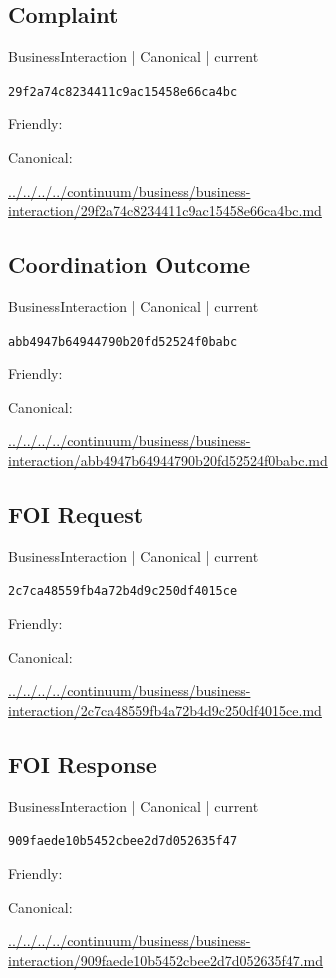 \documentclass[10pt,a4paper]{article}
\begin{document}
\subsection*{Complaint}
{\small BusinessInteraction | Canonical | current}\par
\texttt{29f2a74c8234411c9ac15458e66ca4bc}\par
Friendly: \par
Canonical: \par
{\footnotesize\url{../../../../continuum/business/business-interaction/29f2a74c8234411c9ac15458e66ca4bc.md}}\par
\subsection*{Coordination Outcome}
{\small BusinessInteraction | Canonical | current}\par
\texttt{abb4947b64944790b20fd52524f0babc}\par
Friendly: \par
Canonical: \par
{\footnotesize\url{../../../../continuum/business/business-interaction/abb4947b64944790b20fd52524f0babc.md}}\par
\subsection*{FOI Request}
{\small BusinessInteraction | Canonical | current}\par
\texttt{2c7ca48559fb4a72b4d9c250df4015ce}\par
Friendly: \par
Canonical: \par
{\footnotesize\url{../../../../continuum/business/business-interaction/2c7ca48559fb4a72b4d9c250df4015ce.md}}\par
\subsection*{FOI Response}
{\small BusinessInteraction | Canonical | current}\par
\texttt{909faede10b5452cbee2d7d052635f47}\par
Friendly: \par
Canonical: \par
{\footnotesize\url{../../../../continuum/business/business-interaction/909faede10b5452cbee2d7d052635f47.md}}\par
\end{document}
